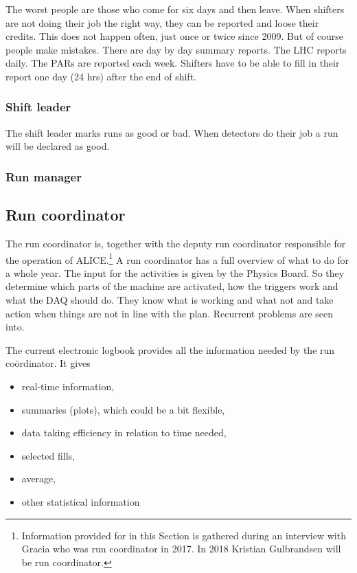 The worst people are those who come for six days and then leave. When shifters are not doing their job the right way, they can be reported and loose their credits. This does not happen often, just once or twice since 2009. But of course people make mistakes. There are day by day summary reports. The LHC reports daily. The PARs are reported each week. Shifters have to be able to fill in their report one day (24 hrs) after the end of shift.

\subsubsection{Shift leader}
The shift leader marks runs as good or bad. When detectors do their job a run will be declared as good. 

\subsubsection{Run manager}

\subsection{Run coordinator}
The run coordinator is, together with the deputy run coordinator responsible for the operation of ALICE.\footnote{Information provided for in this Section is gathered during an interview with Gracia who was run coordinator in 2017. In 2018 Kristian Gulbrandsen will be run coordinator.} A run coordinator has a full overview of what to do for a whole year. The input for the activities is given by the Physics Board. So they determine which parts of the machine are activated, how the triggers work and what the DAQ should do. They know what is working and what not and take action when things are not in line with the plan. Recurrent problems are seen into. 

The current electronic logbook provides all the information needed by the run co\"ordinator. It gives
\begin{itemize}
  \item real-time information, 
  \item summaries (plots), which could be a bit flexible,
  \item data taking efficiency in relation to time needed,
  \item selected fills,
  \item average,
  \item other statistical information
\end{itemize}
 
